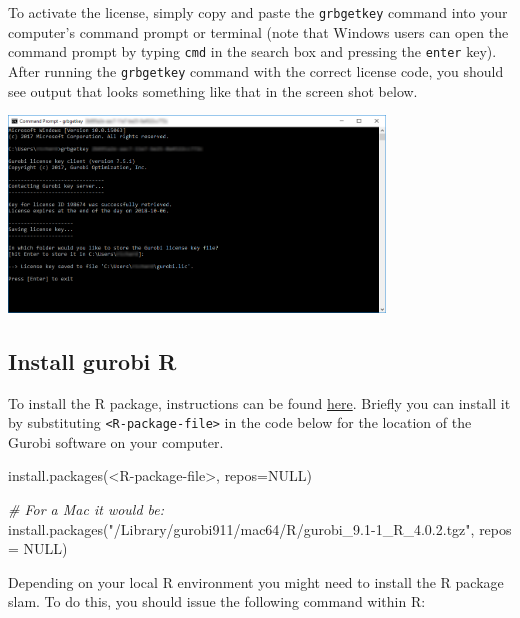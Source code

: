 \documentclass[
  12pt,
]{book}
\newenvironment{Shaded}{\begin{snugshade}}{\end{snugshade}}
\newcommand{\AttributeTok}[1]{\textcolor[rgb]{0.77,0.63,0.00}{#1}}
\newcommand{\CommentTok}[1]{\textcolor[rgb]{0.56,0.35,0.01}{\textit{#1}}}
\newcommand{\ConstantTok}[1]{\textcolor[rgb]{0.00,0.00,0.00}{#1}}
\newcommand{\FunctionTok}[1]{\textcolor[rgb]{0.00,0.00,0.00}{#1}}
\newcommand{\NormalTok}[1]{#1}
\newcommand{\StringTok}[1]{\textcolor[rgb]{0.31,0.60,0.02}{#1}}
\begin{document}
To activate the license, simply copy and paste the \texttt{grbgetkey} command into your computer's command prompt or terminal (note that Windows users can open the command prompt by typing \texttt{cmd} in the search box and pressing the \texttt{enter} key). After running the \texttt{grbgetkey} command with the correct license code, you should see output that looks something like that in the screen shot below.

\includegraphics[width=0.75\textwidth,height=\textheight]{images/cmd-windows-success.png}

\hypertarget{install-gurobi-r}{%
\subsection{Install gurobi R}\label{install-gurobi-r}}

To install the R package, instructions can be found \href{https://www.gurobi.com/documentation/9.1/refman/ins_the_r_package.html}{here}. Briefly you can install it by substituting \texttt{\textless{}R-package-file\textgreater{}} in the code below for the location of the Gurobi software on your computer.

\begin{Shaded}
\begin{Highlighting}[]
\FunctionTok{install.packages}\NormalTok{(}\StringTok{\textquotesingle{}\textless{}R{-}package{-}file\textgreater{}\textquotesingle{}}\NormalTok{, }\AttributeTok{repos=}\ConstantTok{NULL}\NormalTok{)}

\CommentTok{\# For a Mac it would be:}
\FunctionTok{install.packages}\NormalTok{(}\StringTok{"/Library/gurobi911/mac64/R/gurobi\_9.1{-}1\_R\_4.0.2.tgz"}\NormalTok{, }\AttributeTok{repos =} \ConstantTok{NULL}\NormalTok{)}
\end{Highlighting}
\end{Shaded}

Depending on your local R environment you might need to install the R package slam. To do this, you should issue the following command within R:
\end{document}
